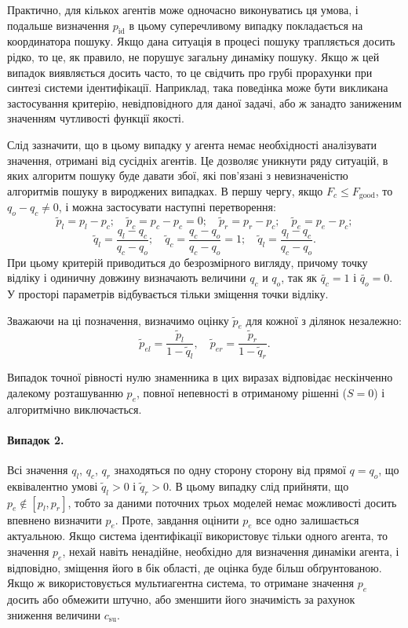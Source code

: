 Практично, для кількох агентів може одночасно виконуватись
ця умова, і подальше визначення
$ p_\mathrm{id} $ в цьому суперечливому випадку покладається на
координатора пошуку. Якщо дана ситуація в процесі пошуку
трапляється досить рідко, то це, як правило, не порушує загальну
динаміку пошуку. Якщо ж цей випадок виявляється досить часто,
то це свідчить про грубі прорахунки при синтезі системи
ідентифікації. Наприклад, така поведінка може бути викликана
застосування критерію, невідповідного для даної задачі,
або ж занадто заниженим значенням чутливості функції якості.

Слід зазначити, що в цьому випадку у агента немає необхідності
аналізувати значення, отримані від сусідніх агентів. Це дозволяє
уникнути ряду ситуацій, в яких алгоритм пошуку буде давати
збої, які пов'язані з невизначеністю алгоритмів пошуку в вироджених
випадках.
%
В першу чергу, якщо
$F_c \le F_\mathrm{good}$, то $q_o -q_c \ne 0$,
і можна застосувати наступні перетворення:
%
\[
  \tilde{p}_l = p_l - p_c;
  \quad
  \tilde{p}_c = p_c - p_c = 0;
  \quad
  \tilde{p}_r = p_r - p_c;
  \quad
  \tilde{p}_e = p_e - p_c;
\]
%
\begin{equation}
  \tilde{q}_l = \frac{q_l-q_c}{q_c-q_o};
  \quad
  \tilde{q}_c = \frac{q_c-q_o}{q_c-q_o} = 1;
  \quad
  \tilde{q}_l = \frac{q_l-q_c}{q_c-q_o}.
  \label{atu:eq:q_agent_rel}
\end{equation}
%
При цьому критерій приводиться до безрозмірного вигляду,
причому точку відліку і одиничну довжину визначають величини
$q_c$ и $q_o$, так як $\tilde{q_c} = 1$ і $\tilde{q_o} = 0$.
У просторі параметрів відбувається тільки зміщення точки відліку.

Зважаючи на ці позначення, визначимо оцінку
$\tilde{p}_e$
для кожної з ділянок незалежно:
%
\begin{equation}
  \tilde{p}_{el} = \frac{\tilde{p}_l}{1-\tilde{q}_l},
  \quad
  \tilde{p}_{er} = \frac{\tilde{p}_r}{1-\tilde{q}_r}.
  \label{atu:eq:pr_ex}
\end{equation}

Випадок точної рівності нулю знаменника в цих виразах відповідає нескінченно
далекому розташуванню $p_e$, повної непевності в отриманому рішенні ($S = 0$)
і алгоритмічно виключається.


\paragraph{Випадок 2.} %
%
Всі значення
$q_l $, $q_c $, $q_r $ знаходяться по одну сторону сторону від прямої
$q = q_o$, що еквівалентно умові
$\tilde{q}_l> 0 $ і $\tilde{q}_r> 0 $.
В цьому випадку слід прийняти, що
$p_e \notin [p_l, p_r] $, тобто за даними поточних трьох моделей немає
можливості досить впевнено визначити
$ p_e $. Проте, завдання оцінити
$ p_e $ все одно залишається актуальною. Якщо система ідентифікації
використовує тільки одного агента, то значення
$ p_e $, нехай навіть ненадійне, необхідно для визначення динаміки
агента, і відповідно, зміщення його в бік області, де оцінка буде
більш обґрунтованою. Якщо ж використовується мультиагентна
система, то отримане значення
$ p_e $ досить або обмежити штучно, або зменшити його значимість
за рахунок зниження величини
$ c_\mathrm{su} $.

